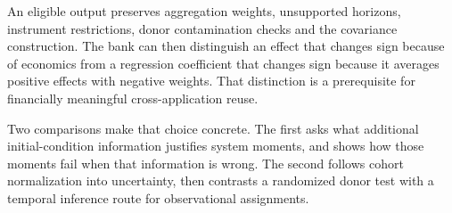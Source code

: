 An eligible output preserves aggregation weights, unsupported horizons,
instrument restrictions, donor contamination checks and the covariance
construction. The bank can then distinguish an effect that changes
sign because of economics from a regression coefficient that changes
sign because it averages positive effects with negative weights.
That distinction is a prerequisite for financially meaningful
cross-application reuse.

Two comparisons make that choice concrete. The first asks what additional
initial-condition information justifies system moments, and shows how those
moments fail when that information is wrong. The second follows cohort
normalization into uncertainty, then contrasts a randomized donor test
with a temporal inference route for observational assignments.




